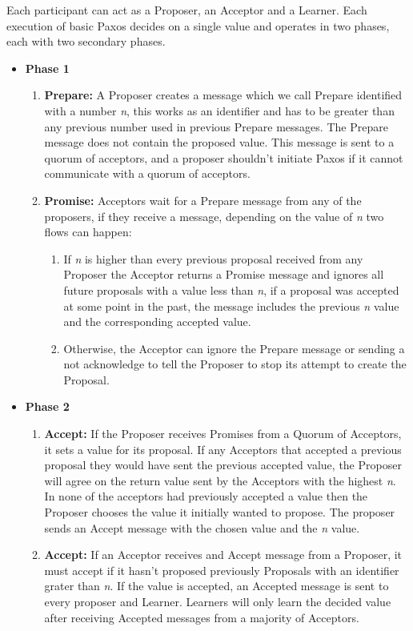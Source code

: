 Each participant can act as a Proposer, an Acceptor and a Learner. Each execution 
of basic Paxos decides on a single value and operates in two phases, each with two
secondary phases.

\begin{itemize}
  \item \textbf{Phase 1}
  \begin{enumerate}
    \item \textbf{Prepare:} A Proposer creates a message which we call Prepare identified
with a number \textit{n}, this works as an identifier and has to be greater than
any previous number used in previous Prepare messages. The Prepare message does
not contain the proposed value. This message is sent to a quorum of acceptors, and
a proposer shouldn't initiate Paxos if it cannot communicate with a quorum of acceptors.
    \item \textbf{Promise:} Acceptors wait for a Prepare message from any of the proposers,
if they receive a message, depending on the value of \textit{n} two flows can happen:
    \begin{enumerate}
      \item If \textit{n} is higher than every previous proposal received from any Proposer
the Acceptor returns a Promise message and ignores all future proposals with a value
less than \textit{n}, if a proposal was accepted at some point in the past, the message
includes the previous \textit{n} value and the corresponding accepted value.
      \item Otherwise, the Acceptor can ignore the Prepare message or sending a not
acknowledge to tell the Proposer to stop its attempt to create the Proposal.
    \end{enumerate}
  \end{enumerate}

  \item \textbf{Phase 2}
  \begin{enumerate}
    \item \textbf{Accept:} If the Proposer receives Promises from a Quorum of Acceptors,
it sets a value for its proposal. If any Acceptors that accepted a previous proposal
they would have sent the previous accepted value, the Proposer will agree on the return
value sent by the Acceptors with the highest \textit{n}. In none of the acceptors had
previously accepted a value then the Proposer chooses the value it initially wanted to propose.
The proposer sends an Accept message with the chosen value and the \textit{n} value.
  \item \textbf{Accept:} If an Acceptor receives and Accept message from a Proposer,
it must accept if it hasn't proposed previously Proposals with an identifier grater than
\textit{n}. If the value is accepted, an Accepted message is sent to every proposer and Learner.
Learners will only learn the decided value after receiving Accepted messages from a majority
of Acceptors.
  \end{enumerate}
\end{itemize}

